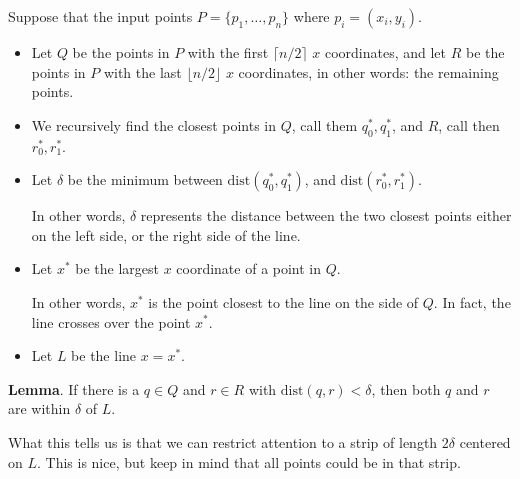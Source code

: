 \documentclass[12pt]{article}
\begin{document}
  Suppose that the input points $P = \{p_1, \dots, p_n\}$ where $p_i = (x_i,
  y_i)$. 
  \begin{itemize}
    \item Let $Q$ be the points in $P$ with the first $\lceil n / 2 \rceil$ $x$
      coordinates, and let $R$ be the points in $P$ with the last $\lfloor n / 2
      \rfloor$ $x$ coordinates, in other words: the remaining points.

    \item We recursively find the closest points in $Q$, call them $q_0^*,
      q_1^*$, and $R$, call then $r_0^*, r_1^*$.

    \item Let $\delta$ be the minimum between $\text{dist}(q_0^*, q_1^*)$, and
      $\text{dist}(r_0^*, r_1^*)$.

      In other words, $\delta$ represents the distance between the two closest
      points either on the left side, or the right side of the line.

    \item Let $x^*$ be the largest $x$ coordinate of a point in $Q$.

      In other words, $x^*$ is the point closest to the line on the side of $Q$.
      In fact, the line crosses over the point $x^*$.

    \item Let $L$ be the line $x = x^*$.
  \end{itemize}


  {\bf Lemma}. If there is a $q \in Q$ and $r \in R$ with $\text{dist}(q, r) <
  \delta$, then both $q$ and $r$ are within $\delta$ of $L$.

  What this tells us is that we can restrict attention to a strip of length
  $2\delta$ centered on $L$. This is nice, but keep in mind that all points could
  be in that strip.
\end{document}
